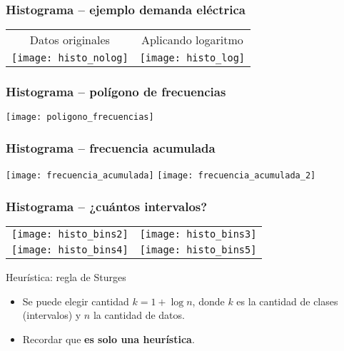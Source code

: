 \documentclass[table]{beamer}
\begin{document}
\begin{frame}
    \frametitle{Histograma -- ejemplo demanda eléctrica}
    \begin{center}
        \begin{tabular}{cc}
            Datos originales & Aplicando logaritmo \\
            \texttt{[image: histo\_nolog]} &
            \texttt{[image: histo\_log]}
        \end{tabular}
    \end{center}
\end{frame}

\begin{frame}
    \frametitle{Histograma -- polígono de frecuencias}
    \begin{center}
        \texttt{[image: poligono\_frecuencias]}
    \end{center}
\end{frame}

\begin{frame}
    \frametitle{Histograma -- frecuencia acumulada}
    \begin{center}
        \texttt{[image: frecuencia\_acumulada]}
        \texttt{[image: frecuencia\_acumulada\_2]}
    \end{center}
\end{frame}

\begin{frame}
    \frametitle{Histograma -- ¿cuántos intervalos?}
    \begin{center}
        \begin{tabular}{cc}
            \texttt{[image: histo\_bins2]} &
            \texttt{[image: histo\_bins3]} \\
            \texttt{[image: histo\_bins4]} &
            \texttt{[image: histo\_bins5]}
        \end{tabular}
    \end{center}
    \begin{alertblock}{Heurística: regla de Sturges}
        \begin{itemize}
            \item Se puede elegir cantidad $k = 1 + \log n$, donde $k$ es la cantidad de clases (intervalos) y $n$ la cantidad de datos.
            \item Recordar que \textbf{es solo una heurística}.
        \end{itemize}
    \end{alertblock}
\end{frame}
\end{document}
